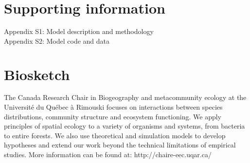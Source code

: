 \documentclass[11pt]{article}
\begin{document}
\renewcommand\refname{Literature Cited}
{}


%
%
\section*{Supporting information}
Appendix S1: Model description and methodology \\
Appendix S2: Model code and data

%
%

\section*{Biosketch}
The Canada Research Chair in Biogeography and metacommunity ecology at the Université du Québec à Rimouski focuses on interactions between species distributions, community structure and ecosystem functioning.
We apply principles of spatial ecology to a variety of organisms and systems, from bacteria to entire forests.
We also use theoretical and simulation models to develop hypotheses and extend our work beyond the technical limitations of empirical studies.
More information can be found at: http://chaire-eec.uqar.ca/
\end{document}
